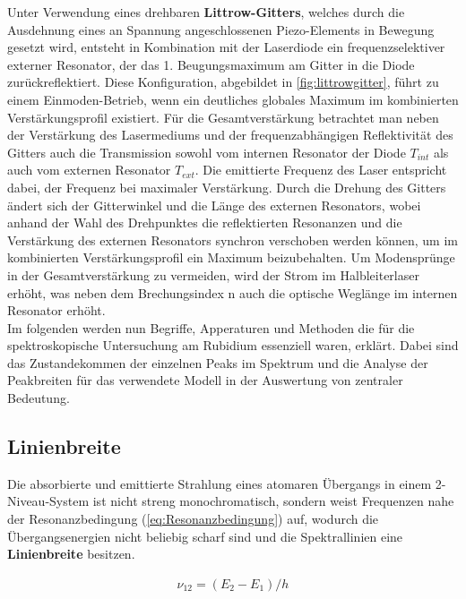 \noindent Unter Verwendung eines drehbaren \textbf{Littrow-Gitters}, welches durch die Ausdehnung eines an Spannung angeschlossenen Piezo-Elements in Bewegung gesetzt wird, entsteht in Kombination mit der Laserdiode ein frequenzselektiver externer Resonator, der das 1. Beugungsmaximum am Gitter in die Diode zurückreflektiert. Diese Konfiguration, abgebildet in \ref{fig:littrowgitter}, führt zu einem Einmoden-Betrieb, wenn ein deutliches globales Maximum im kombinierten Verstärkungsprofil existiert. Für die Gesamtverstärkung betrachtet man neben der Verstärkung des Lasermediums und der frequenzabhängigen Reflektivität des Gitters auch die Transmission sowohl vom internen Resonator der Diode $T_{int}$ als auch vom externen Resonator $T_{ext}$. Die emittierte Frequenz des Laser entspricht dabei, der Frequenz bei maximaler Verstärkung. Durch die Drehung des Gitters ändert sich der Gitterwinkel und die Länge des externen Resonators, wobei anhand der Wahl des Drehpunktes die reflektierten Resonanzen und die Verstärkung des externen Resonators synchron verschoben werden können, um im kombinierten Verstärkungsprofil ein Maximum beizubehalten. Um Modensprünge in der Gesamtverstärkung zu vermeiden, wird der Strom im Halbleiterlaser erhöht, was neben dem Brechungsindex n auch die optische Weglänge im internen Resonator erhöht. \cite{H2}\\

 \noindent Im folgenden werden nun Begriffe, Apperaturen und Methoden die für die spektroskopische Untersuchung am Rubidium essenziell waren, erklärt. Dabei sind das Zustandekommen der einzelnen Peaks im Spektrum und die Analyse der Peakbreiten für das verwendete Modell in der Auswertung von zentraler Bedeutung.

\subsection{Linienbreite}
\label{subsec:linewidth}

\noindent Die absorbierte und emittierte Strahlung eines atomaren Übergangs in einem 2-Niveau-System ist nicht streng monochromatisch, sondern weist Frequenzen nahe der Resonanzbedingung (\ref{eq:Resonanzbedingung}) auf, wodurch die Übergangsenergien nicht beliebig scharf sind und die Spektrallinien eine \textbf{Linienbreite} besitzen.

\begin{align}
    \nu_{12}=(E_{2}-E_{1})/ h \label{eq:Resonanzbedingung}
\end{align}

